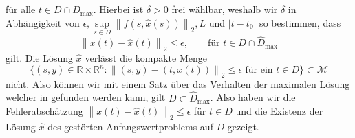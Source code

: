 für alle $t \in D \cap \hat{D}_{\text{max}}$. Hierbei ist $\delta > 0$ frei wählbar, weshalb wir $\delta$ in
Abhängigkeit von $\epsilon, \sup\limits_{s \in D}\left\lVert f(s,\hat{x}(s))\right\rVert_2, L$ und $|t-t_0|$ so
bestimmen, dass
\[
    \left\lVert x(t) - \hat{x}(t) \right\rVert_2 \leq \epsilon, \qquad \text{für } t \in D \cap \hat{D}_{\text{max}}
\]
gilt. Die Lösung $\hat{x}$ verlässt die kompakte Menge
\[
    \{(s,y) \in \mathbb{R} \times \mathbb{R}^n: \left\lVert (s,y) - (t,x(t)) \right\rVert_2 \leq \epsilon
    \text{ für ein } t \in D \} \subset \mathcal{M}
\]
nicht. Also können wir mit einem Satz über das Verhalten der maximalen Lösung welcher in
\cite[Seite 60, Satz 3.21]{beckGewohnlicheDifferentialgleichungen2018} gefunden werden kann, gilt
$D \subset \hat{D}_{\text{max}}$. Also haben wir die Fehlerabschätzung $\left\lVert x(t) - \hat{x}(t) \right\rVert_2 \leq \epsilon$
für $t \in D$ und die Existenz der Lösung $\hat{x}$ des gestörten Anfangswertproblems auf $D$ gezeigt. \qedwhite \\
